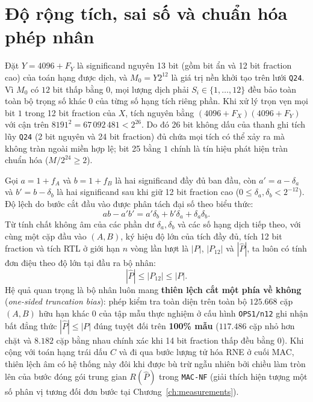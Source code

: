 \section{Độ rộng tích, sai số và chuẩn hóa phép nhân}

Đặt $Y = 4096 + F_Y$ là significand nguyên 13 bit (gồm bit ẩn và 12 bit fraction
cao) của toán hạng được dịch, và $M_0 = Y 2^{12}$ là giá trị nền khởi tạo trên
lưới \texttt{Q24}. Vì $M_0$ có $12$ bit thấp bằng $0$, mọi lượng dịch phải
$S_i \in \{1, \dots, 12\}$ đều bảo toàn toàn bộ trọng số khác $0$ của từng số
hạng tích riêng phần. Khi xử lý trọn vẹn mọi bit $1$ trong 12 bit fraction của $X$,
tích nguyên bằng $(4096+F_X)(4096+F_Y)$ với cận trên $8191^2 = 67\,092\,481 < 2^{26}$.
Do đó 26 bit không dấu của thanh ghi tích lũy \texttt{Q24} (2 bit nguyên và 24 bit
fraction) đủ chứa mọi tích có thể xảy ra mà không tràn ngoài miền hợp lệ; bit 25
bằng $1$ chính là tín hiệu phát hiện tràn chuẩn hóa ($M/2^{24} \ge 2$).

Gọi $a = 1+f_A$ và $b = 1+f_B$ là hai significand đầy đủ ban đầu, còn
$a' = a - \delta_a$ và $b' = b - \delta_b$ là hai significand sau khi giữ 12 bit
fraction cao ($0 \le \delta_a, \delta_b < 2^{-12}$). Độ lệch do bước cắt đầu vào
được phân tách đại số theo biểu thức:
\[
ab - a'b' = a'\delta_b + b'\delta_a + \delta_a\delta_b.
\]
Từ tính chất không âm của các phần dư $\delta_a, \delta_b$ và các số hạng dịch
tiếp theo, với cùng một cặp đầu vào $(A, B)$, ký hiệu độ lớn của tích đầy đủ,
tích 12 bit fraction và tích RTL ở giới hạn $n$ vòng lần lượt là $|P|$, $|P_{12}|$
và $|\widehat P|$, ta luôn có tính đơn điệu theo độ lớn tại đầu ra bộ nhân:
\[
|\widehat P| \le |P_{12}| \le |P|.
\]
Hệ quả quan trọng là bộ nhân luôn mang \textbf{thiên lệch cắt một phía về không}
(\textit{one-sided truncation bias}): phép kiểm tra toàn diện trên toàn bộ
$125.668$ cặp $(A,B)$ hữu hạn khác $0$ của tập mẫu thực nghiệm ở cấu hình
\texttt{OPS1/n12} ghi nhận bất đẳng thức $|\widehat P| \le |P|$ đúng tuyệt đối
trên \textbf{100\% mẫu} ($117.486$ cặp nhỏ hơn chặt và $8.182$ cặp bằng nhau
chính xác khi 14 bit fraction thấp đều bằng $0$). Khi cộng với toán hạng trái dấu
$C$ và đi qua bước lượng tử hóa RNE ở cuối MAC, thiên lệch âm có hệ thống này đôi
khi được bù trừ ngẫu nhiên bởi chiều làm tròn lên của bước đóng gói trung gian
$R(\widehat P)$ trong \texttt{MAC-NF} (giải thích hiện tượng một số phân vị
tương đối đơn bước tại Chương~\ref{ch:measurements}).

